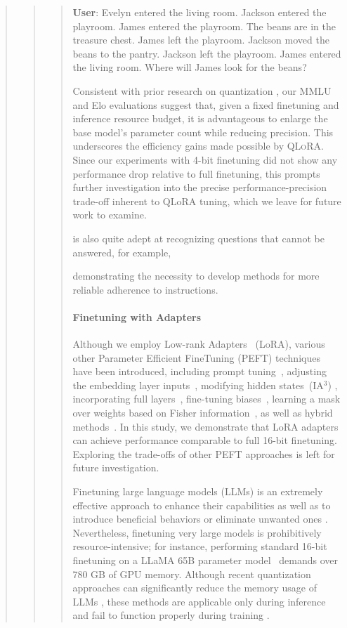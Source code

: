 \begin{quote}
\begin{quote}
\begin{quote}
    \textbf{User}: Evelyn entered the living room. Jackson entered the playroom. James entered the playroom. The beans are in the treasure chest. James left the playroom. Jackson moved the beans to the pantry. Jackson left the playroom. James entered the living room. Where will James look for the beans?

Consistent with prior research on quantization \citep{dettmers2022case}, our MMLU and Elo evaluations suggest that, given a fixed finetuning and inference resource budget, it is advantageous to enlarge the base model’s parameter count while reducing precision. This underscores the efficiency gains made possible by \textsc{QLoRA}. Since our experiments with 4-bit finetuning did not show any performance drop relative to full finetuning, this prompts further investigation into the precise performance-precision trade-off inherent to QLoRA tuning, which we leave for future work to examine.

is also quite adept at recognizing questions that cannot be answered, for example,

demonstrating the necessity to develop methods for more reliable adherence to instructions.

\paragraph{Finetuning with Adapters} Although we employ Low-rank Adapters~\citep{hu2021lora} (LoRA), various other Parameter Efficient FineTuning (PEFT) techniques have been introduced, including prompt tuning~\citep{qin2021learning,lester2021power,li2021prefix}, adjusting the embedding layer inputs~\citep{an2022input}, modifying hidden states~(IA$^3$) \citep{liu2022few}, incorporating full layers~\citep{houlsby2019parameter}, fine-tuning biases~\citep{zaken2021bitfit}, learning a mask over weights based on Fisher information~\citep{sung2021training}, as well as hybrid methods~\citep{henderson2021compacter}. In this study, we demonstrate that LoRA adapters can achieve performance comparable to full 16-bit finetuning. Exploring the trade-offs of other PEFT approaches is left for future investigation.

Finetuning large language models (LLMs) is an extremely effective approach to enhance their capabilities \citep{min2021metaicl, wei2021finetuned, ouyang2022training, wang2022super, wang2022self, liu2022few} as well as to introduce beneficial behaviors or eliminate unwanted ones \citep{ouyang2022training,askell2021general,bai2022training}. Nevertheless, finetuning very large models is prohibitively resource-intensive; for instance, performing standard 16-bit finetuning on a LLaMA 65B parameter model~\citep{touvron2023llama} demands over 780 GB of GPU memory. Although recent quantization approaches can significantly reduce the memory usage of LLMs \citep{dettmers2022llm, dettmers2022case, frantar2022gptq, xiao2022smoothquant}, these methods are applicable only during inference and fail to function properly during training \citep{wortsman2023stable}.


\end{quote}
\end{quote}
\end{quote}
